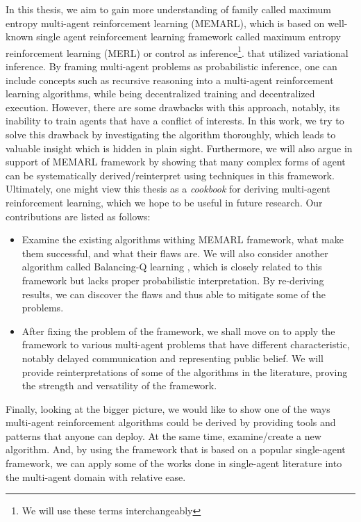 In this thesis, we aim to gain more understanding of family called maximum entropy multi-agent reinforcement learning (MEMARL), which is based on well-known single agent reinforcement learning framework called maximum entropy reinforcement learning (MERL) or control as inference\footnote{We will use these terms interchangeably}. that utilized variational inference. By framing multi-agent problems as probabilistic inference, one can include concepts such as recursive reasoning \cite{wen2019probabilistic, wen2019multi} into a multi-agent reinforcement learning algorithms, while being decentralized training and decentralized execution. However, there are some drawbacks with this approach, notably, its inability to train agents that have a conflict of interests. In this work, we try to solve this drawback by investigating the algorithm thoroughly, which leads to valuable insight which is hidden in plain sight. Furthermore, we will also argue in support of MEMARL framework by showing that many complex forms of agent can be systematically derived/reinterpret using techniques in this framework. Ultimately, one might view this thesis as a \textit{cookbook} for deriving multi-agent reinforcement learning, which we hope to be useful in future research. Our contributions are listed as follows:
\begin{itemize}
    \item Examine the existing algorithms withing MEMARL framework, what make them successful, and what their flaws are. We will also consider another algorithm called Balancing-Q learning \cite{grau2018balancing}, which is closely related to this framework but lacks proper probabilistic interpretation. By re-deriving results, we can discover the flaws and thus able to mitigate some of the problems. 
    \item After fixing the problem of the framework, we shall move on to apply the framework to various multi-agent problems that have different characteristic, notably delayed communication and representing public belief. We will provide reinterpretations of some of the algorithms in the literature, proving the strength and versatility of the framework.
\end{itemize}
Finally, looking at the bigger picture, we would like to show one of the ways multi-agent reinforcement algorithms could be derived by providing tools and patterns that anyone can deploy. At the same time, examine/create a new algorithm. And, by using the framework that is based on a popular single-agent framework, we can apply some of the works done in single-agent literature into the multi-agent domain with relative ease. 